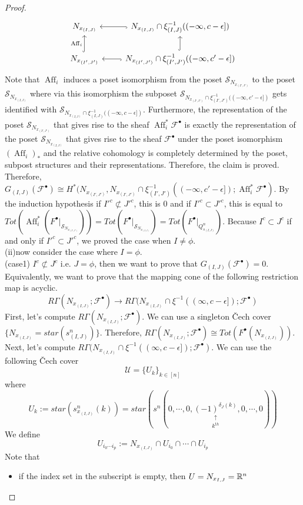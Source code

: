 \begin{proof}
\[\begin{tikzcd}
N_{x_{(I,J)}}   & N_{x_{(I,J)}} \cap \xi_{(I,J)}^{-1}((-\infty,c-\epsilon])\arrow[l, hook] \\
N_{x_{(I',J')}} \arrow[u, hook, "\operatorname{Aff}_i"]& N_{x_{(I',J')}}\cap \xi_{(I',J')}^{-1}((-\infty,c'-\epsilon])\arrow[l, hook]\arrow[u, hook] 
\end{tikzcd}
\]
Note that $\operatorname{Aff}_i$ induces a poset isomorphism from the poset $\mathcal{S}_{N_{x_{(I',J')}}}$ to the poset $\mathcal{S}_{N_{x_{(I,J)}}}$ where via this isomorphism the subposet $\mathcal{S}_{N_{x_{(I',J')}}\cap \xi_{(I',J')}^{-1}((-\infty,c'-\epsilon])}$ gets identified with $\mathcal{S}_{N_{x_{(I,J)}}\cap \xi_{(I,J)}^{-1}((-\infty,c-\epsilon])}$. Furthermore, the representation of the poset $\mathcal{S}_{N_{x_{(I',J')}}}$ that gives rise to the sheaf $\operatorname{Aff}_i^* \mathscr{F}^\bullet$ is exactly the representation of the poset $\mathcal{S}_{N_{x_{(I,J)}}}$ that gives rise to the sheaf $\mathscr{F}^\bullet$ under the poset isomorphism $(\operatorname{Aff}_i)_*$ and the relative cohomology is completely determined by the poset, subpost structures and their representations. Therefore, the claim is proved.\\
Therefore, $G_{(I,J)}(\mathscr{F}^\bullet) \cong H^*(N_{x_{(I',J')}}, N_{x_{(I',J')}}\cap \xi_{(I',J')}^{-1}((-\infty, c'-\epsilon]); \operatorname{Aff}_i^*\mathscr{F}^\bullet)$. By the induction hypothesis if $I'^c \not\subset J'^c$, this is $0$ and if $I'^c \subset J'^c$, this is equal to $Tot(\operatorname{Aff}_i^*(F^\bullet |_{\mathcal{S}_{N_{x_{(I',J')}}}})) = Tot(F^\bullet |_{\mathcal{S}_{N_{x_{(I,J)}}}}) = Tot(F^\bullet |_{Q^n_{s_{(I,J)}}})$. Because $I^c\subset J^c$ if and only if $I'^c\subset J'^c$, we proved the case when $I\neq \phi$.\\
(ii)now consider the case where $I = \phi$.\\
(case1) $I^c \not\subset J^c$ i.e. $J = \phi$, then we want to prove that $G_{(I,J)}(\mathscr{F}^\bullet)=0$. Equivalently, we want to prove that the mapping cone of the following restriction map is acyclic.
\[
R\Gamma(N_{x_{(I,J)}};\mathscr{F}^\bullet) \rightarrow R\Gamma(N_{x_{(I,J)}} \cap \xi^{-1}((\infty,c-\epsilon]);\mathscr{F}^\bullet)
\]
First, let's compute $R\Gamma(N_{x_{(I,J)}};\mathscr{F}^\bullet)$. We can use a singleton \v{C}ech cover $\{N_{x_{(I,J)}} = star(s^n_{(I,J)})\}$. Therefore, $R\Gamma(N_{x_{(I,J)}};\mathscr{F}^\bullet) \cong Tot(F^\bullet(N_{x_{(I,J)}}))$.\\
Next, let's compute $R\Gamma(N_{x_{(I,J)}} \cap \xi^{-1}((\infty,c-\epsilon]);\mathscr{F}^\bullet)$. We can use the following \v{C}ech cover
\[
\mathcal{U}=\{U_k\}_{k\in [n]}
\]
where 
\[
U_k := star(s^n_{x_{(I,J)}}(k)) = star(s^n(0,\cdots,0,\underset{k^{th}}{\underset{\uparrow}{(-1)^{\delta_J(k)}}},0,\cdots,0))
\]
We define
\[
U_{i_0 \cdots i_p} := N_{x_{(I,J)}} \cap U_{i_0} \cap \cdots \cap U_{i_p}
\]
Note that 
\begin{itemize}
\item if the index set in the subscript is empty, then $U= N_{x_{I,J}} = \mathbb{R}^n$


\end{itemize}
\end{proof}
